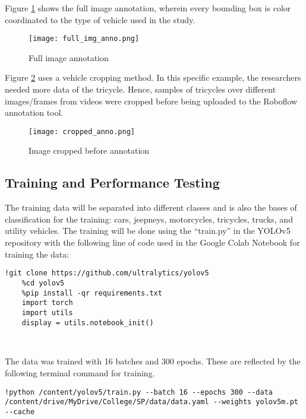 Figure \ref{fig:full_img_anno} shows the full image annotation, wherein every bounding box is color coordinated to the type of vehicle used in the study.

\begin{figure}[h!]
	\texttt{[image: full\_img\_anno.png]}
	\caption{Full image annotation}
	\label{fig:full_img_anno}
\end{figure}

Figure \ref{fig:cropped_anno} uses a vehicle cropping method. In this specific example, the researchers needed more data of the tricycle. Hence, samples of tricycles over different images/frames from videos were cropped before being uploaded to the Roboflow annotation tool. 

\begin{figure}[h!]
	\texttt{[image: cropped\_anno.png]}
	\caption{Image cropped before annotation}
	\label{fig:cropped_anno}
\end{figure}

\newpage

\subsection {Training and Performance Testing}

The training data will be separated into different classes and is also the bases of classification for the training: cars, jeepneys, motorcycles, tricycles, trucks, and utility vehicles. The training will be done using the “train.py” in the YOLOv5 repository with the following line of code used in the Google Colab Notebook for training the data:


\begin{lstlisting}[frame=single]
	!git clone https://github.com/ultralytics/yolov5
	%cd yolov5
	%pip install -qr requirements.txt
	import torch
	import utils
	display = utils.notebook_init()
	
	
\end{lstlisting}

The data was trained with 16 batches and 300 epochs. These are reflected by the following terminal command for training.

\newpage


\begin{lstlisting}[frame=single]
	!python /content/yolov5/train.py --batch 16 --epochs 300 --data /content/drive/MyDrive/College/SP/data/data.yaml --weights yolov5m.pt --cache
	
\end{lstlisting}

